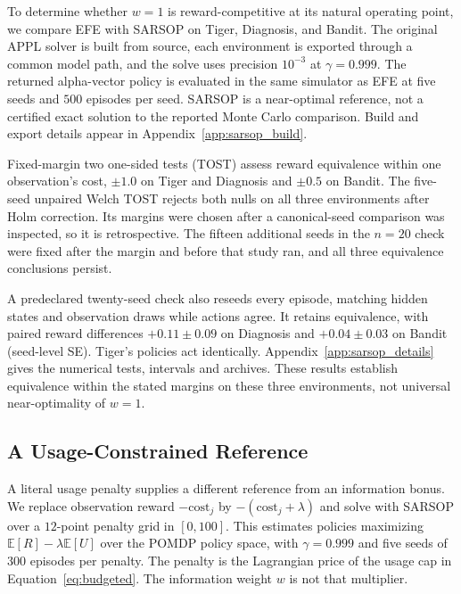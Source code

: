 \documentclass[manuscript, screen, review]{jair}
\begin{document}
To determine whether $w{=}1$ is reward-competitive at its natural operating point, we compare EFE with SARSOP \citep{kurniawati2008} on Tiger, Diagnosis, and Bandit. The original APPL solver is built from source, each environment is exported through a common model path, and the solve uses precision $10^{-3}$ at $\gamma{=}0.999$. The returned alpha-vector policy is evaluated in the same simulator as EFE at five seeds and $500$ episodes per seed. SARSOP is a near-optimal reference, not a certified exact solution to the reported Monte Carlo comparison. Build and export details appear in Appendix~\ref{app:sarsop_build}.

Fixed-margin two one-sided tests (TOST) \citep{schuirmann1987} assess reward equivalence within one observation's cost, $\pm1.0$ on Tiger and Diagnosis and $\pm0.5$ on Bandit. The five-seed unpaired Welch TOST rejects both nulls on all three environments after Holm correction. Its margins were chosen after a canonical-seed comparison was inspected, so it is retrospective. The fifteen additional seeds in the $n=20$ check were fixed after the margin and before that study ran, and all three equivalence conclusions persist.

A predeclared twenty-seed check also reseeds every episode, matching hidden states and observation draws while actions agree. It retains equivalence, with paired reward differences $+0.11\pm0.09$ on Diagnosis and $+0.04\pm0.03$ on Bandit (seed-level SE). Tiger's policies act identically. Appendix~\ref{app:sarsop_details} gives the numerical tests, intervals and archives. These results establish equivalence within the stated margins on these three environments, not universal near-optimality of $w=1$.

\subsection{A Usage-Constrained Reference}
\label{sec:cpomdp}

A literal usage penalty supplies a different reference from an information bonus. We replace observation reward $-\mathrm{cost}_j$ by $-(\mathrm{cost}_j+\lambda)$ and solve with SARSOP over a $12$-point penalty grid in $[0,100]$. This estimates policies maximizing $\mathbb E[R]-\lambda\mathbb E[U]$ over the POMDP policy space, with $\gamma{=}0.999$ and five seeds of $300$ episodes per penalty. The penalty is the Lagrangian price of the usage cap in Equation~\ref{eq:budgeted}. The information weight $w$ is not that multiplier.
\end{document}

